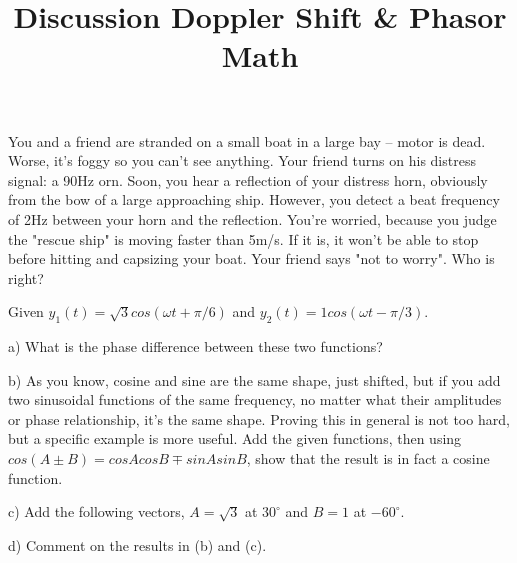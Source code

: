 \documentclass[10pt]{article}
\newenvironment{problem}[2][Problem]{\begin{trivlist}
\item[\hskip \labelsep {\bfseries #1}\hskip \labelsep {\bfseries #2.}]}{\end{trivlist}}
\begin{document}
 \title{Discussion Doppler Shift \& Phasor Math}
 \author{}
\date{}
\maketitle

\begin{problem}{1}
You and a friend are stranded on a small boat in a large bay -- motor is dead. Worse, it's foggy so you can't see anything. Your friend turns on his distress signal: a 90Hz orn. Soon, you hear a reflection of your distress horn, obviously from the bow of a large approaching ship. However, you detect a beat frequency of 2Hz between your horn and the reflection. You're worried, because you judge the "rescue ship" is moving faster than 5m/s. If it is, it won't be able to stop before hitting and capsizing your boat. Your friend says "not to worry". Who is right?
\end{problem}

\begin{problem}{2}
Given $y_1(t) = \sqrt{3} cos(\omega t + \pi/6)$ and $y_2(t)= 1 cos(\omega t - \pi/3)$.
\item a) What is the phase difference between these two functions?
\item b) As you know, cosine and sine are the same shape, just shifted, but if you add two sinusoidal functions of the same frequency, no matter what their amplitudes or phase relationship, it's the same shape. Proving this in general is not too hard, but a specific example is more useful. Add the given functions, then using $cos(A \pm B) = cosAcosB \mp sinAsinB$, show that the result is in fact a cosine function.
\item c) Add the following vectors, $A=\sqrt{3}$ at $30^\circ$ and $B=1$ at $-60^\circ$.
\item d) Comment on the results in (b) and (c).
\end{problem}





\end{document}
